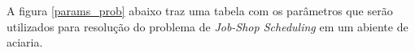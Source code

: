 A figura \ref{params_prob} abaixo traz uma tabela com os parâmetros que serão utilizados para resolução do problema de {\it Job-Shop Scheduling} em um abiente de aciaria.



